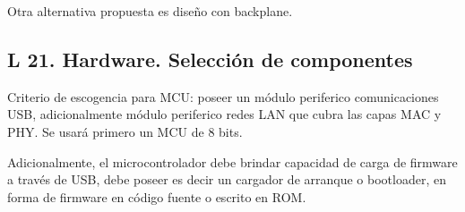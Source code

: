 \documentclass[paper=letter,oneside,fontsize=9pt]{scrartcl}
\begin{document}
	Otra alternativa propuesta es diseño con backplane.
	
	\subsection{L 21. Hardware. Selección de componentes} 	
	
	Criterio de escogencia para MCU: poseer un módulo periferico comunicaciones USB, adicionalmente módulo periferico redes LAN que cubra las capas MAC y PHY. Se usará primero un MCU de 8 bits. 
	
	Adicionalmente, el microcontrolador debe brindar capacidad de carga de firmware a través de USB, debe poseer es decir un cargador de arranque o bootloader, en forma de firmware en código fuente o escrito en ROM.
	
	\subsection{}
\end{document}
